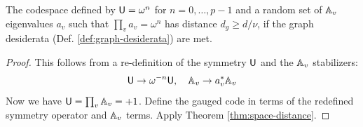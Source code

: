\documentclass[11pt]{article}
\begin{document}
\begin{corollary} 
    The codespace defined by $\mathsf{U} = \omega^n$ for $n = 0, \dots, p-1$ and a random set of $\mathbb{A}_v$ eigenvalues $a_v$ such that $\prod_v a_v = \omega^n$ has distance $d_g \geq d/\nu$, if the graph desiderata (Def. \ref{def:graph-desiderata}) are met.
\end{corollary}
\begin{proof}
    This follows from a re-definition of the symmetry $\mathsf{U}$ and the $\mathbb{A}_v$ stabilizers: 
    \[
    \mathsf{U} \to \omega^{-n} \mathsf{U}, \quad \mathbb{A}_v \to a_v^* \mathbb{A}_v
    \]
    Now we have $\mathsf{U} = \prod_v \mathbb{A}_v = +1$. Define the gauged code in terms of the redefined symmetry operator and $\mathbb{A}_v$ terms. Apply Theorem \ref{thm:space-distance}.
\end{proof}

\ifdefined\ismainfile
\else


    
\end{document}
